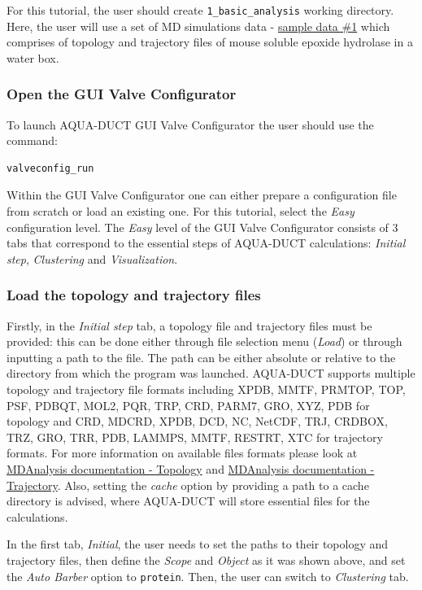 \documentclass[9pt,tutorial]{livecoms}
\begin{document}
For this tutorial, the user should create \texttt{1\_basic\_analysis} working directory. Here, the user will use a set of MD simulations data
- \href{http://www.aquaduct.pl/sample-data/}{sample data \#1} which comprises of topology and trajectory files of mouse soluble epoxide hydrolase in a water box.

\subsubsection{Open the GUI Valve Configurator}
To launch AQUA-DUCT GUI Valve Configurator the user should use the command:
\begin{lstlisting}
valveconfig_run
\end{lstlisting}
Within the GUI Valve Configurator one can either prepare a configuration file from scratch or load an existing one. 
For this tutorial, select the \textit{Easy} configuration level. The \textit{Easy} level of the GUI Valve Configurator consists of 3 tabs that correspond to the essential steps of AQUA-DUCT calculations: \textit{Initial step}, \textit{Clustering} and \textit{Visualization}.

\subsubsection{Load the topology and trajectory files}
Firstly, in the \textit{Initial step} tab, a topology file and trajectory files must be provided: this can be done either through file selection menu (\textit{Load}) or through inputting a path to the file. The path can be either absolute or relative to the directory from which the program was launched. AQUA-DUCT supports multiple topology and trajectory file formats including XPDB, MMTF, PRMTOP, TOP, PSF, PDBQT, MOL2, PQR, TRP, CRD, PARM7, GRO, XYZ, PDB for topology and CRD, MDCRD, XPDB, DCD, NC, NetCDF, TRJ, CRDBOX, TRZ, GRO, TRR, PDB, LAMMPS, MMTF, RESTRT, XTC for trajectory formats. For more information on available files formats please look at \href{https://www.mdanalysis.org/docs/documentation_pages/topology/init.html}{MDAnalysis documentation - Topology} and \href{https://www.mdanalysis.org/docs/documentation_pages/coordinates/init.html}{MDAnalysis documentation - Trajectory}. Also, setting the \textit{cache} option by providing a path to a cache directory is advised, where AQUA-DUCT will store essential files for the calculations.

In the first tab, \textit{Initial}, the user needs to set the paths to their topology and trajectory files, then define the \emph{Scope} and \emph{Object} as it was shown above, and set the \textit{Auto Barber} option to \texttt{protein}. Then, the user can switch to \textit{Clustering} tab.
\end{document}

